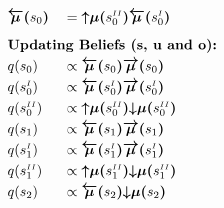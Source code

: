 \documentclass[fleqn]{article}
\begin{document}
\begin{minipage}[t]{0.5\textwidth}
\begin{alignat}{2}
         & \bm{\overleftarrow{\mu}(}s_0\bm{)}                               &  & = \bm{{\uparrow}{\mu}(}s^{\scriptscriptstyle II}_0\bm{)} \bm{\overleftarrow{\mu}(}s^{\scriptscriptstyle I}_0\bm{)}                                                             \\[0.5em]
         & \rlap{\text{\bfseries Updating Beliefs (s, u and o):}} \nonumber                                                                                                                                                                                     \\
         & q(s_0)                                                           &  & \propto \bm{\overleftarrow{\mu}(}s_0\bm{)} \bm{\overrightarrow{\mu}(}s_0\bm{)}                                                                                                 \\
         & q(s^{\scriptscriptstyle I}_0)                                    &  & \propto \bm{\overleftarrow{\mu}(}s^{\scriptscriptstyle I}_0\bm{)} \bm{\overrightarrow{\mu}(}s^{\scriptscriptstyle I}_0\bm{)}                                                   \\
         & q(s^{\scriptscriptstyle II}_0)                                   &  & \propto \bm{{\uparrow}{\mu}(}s^{\scriptscriptstyle II}_0\bm{)} \bm{{\downarrow}{\mu}(}s^{\scriptscriptstyle II}_0\bm{)}                                                        \\
         & q(s_1)                                                           &  & \propto \bm{\overleftarrow{\mu}(}s_1\bm{)} \bm{\overrightarrow{\mu}(}s_1\bm{)}                                                                                                 \\
         & q(s^{\scriptscriptstyle I}_1)                                    &  & \propto \bm{\overleftarrow{\mu}(}s^{\scriptscriptstyle I}_1\bm{)} \bm{\overrightarrow{\mu}(}s^{\scriptscriptstyle I}_1\bm{)}                                                   \\
         & q(s^{\scriptscriptstyle II}_1)                                   &  & \propto \bm{{\uparrow}{\mu}(}s^{\scriptscriptstyle II}_1\bm{)} \bm{{\downarrow}{\mu}(}s^{\scriptscriptstyle II}_1\bm{)}                                                        \\
         & q(s_2)                                                           &  & \propto \bm{\overleftarrow{\mu}(}s_2\bm{)} \bm{{\downarrow}{\mu}(}s_2\bm{)}                                                                                                    \\

\end{alignat}
\end{minipage}
\end{document}
